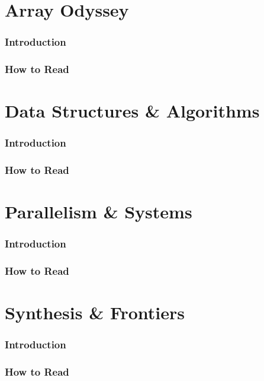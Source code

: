\documentclass[12pt, oneside, openany]{book}
\begin{document}
\part{Array Odyssey}
\section*{Introduction}
\section*{How to Read}
\part{Data Structures \& Algorithms}
\section*{Introduction}
\section*{How to Read}
\part{Parallelism \& Systems}
\section*{Introduction}
\section*{How to Read}
\part{Synthesis \& Frontiers}
\section*{Introduction}
\section*{How to Read}
\end{document}

